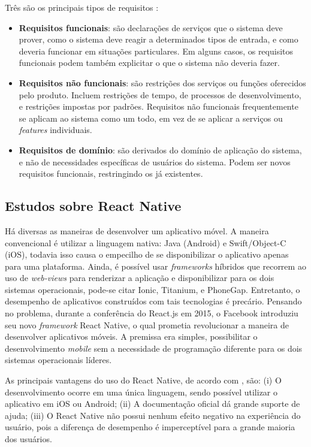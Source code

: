 Três são os principais tipos de requisitos \citep{Sommervile2010}:
\begin{itemize}
    \item \textbf{Requisitos funcionais}: são declarações de serviços que o sistema deve prover, como o sistema deve reagir a determinados tipos de entrada, e como deveria funcionar em situações particulares. Em alguns casos, os requisitos funcionais podem também explicitar o que o sistema não deveria fazer.
    
    \item \textbf{Requisitos não funcionais}: são restrições dos serviços ou funções oferecidos pelo produto. Incluem restrições de tempo, de processos de desenvolvimento, e restrições impostas por padrões. Requisitos não funcionais frequentemente se aplicam ao sistema como um todo, em vez de se aplicar a serviços ou \textit{features} individuais.
    
    \item \textbf{Requisitos de domínio}: são derivados do domínio de aplicação do sistema, e não de necessidades específicas de usuários do sistema. Podem ser novos requisitos funcionais, restringindo os já existentes. 
\end{itemize}


\subsection{Estudos sobre React Native} 
Há diversas as maneiras de desenvolver um aplicativo móvel. A maneira convencional é utilizar a linguagem nativa: Java (Android) e Swift/Object-C (iOS), todavia isso causa o empecilho de se disponibilizar o aplicativo apenas para uma plataforma. Ainda, é possível usar \textit{frameworks} híbridos que recorrem ao uso de \textit{web-views} para renderizar a aplicação e disponibilizar para os dois sistemas operacionais, pode-se citar Ionic, Titanium, e PhoneGap. Entretanto, o desempenho de aplicativos construídos com tais tecnologias é precário. Pensando no problema, durante a conferência do React.js em 2015, o Facebook introduziu seu novo \textit{framework} React Native, o qual prometia revolucionar a maneira de desenvolver aplicativos móveis. A premissa era simples, possibilitar o desenvolvimento \textit{mobile} sem a necessidade de programação diferente para os dois sistemas operacionais líderes.

As principais vantagens do uso do React Native, de acordo com \cite{danielsson2016}, são: (i) O desenvolvimento ocorre em uma única linguagem, sendo possível utilizar o aplicativo em iOS ou Android; (ii) A documentação oficial dá grande suporte de ajuda; (iii) O React Native não possui nenhum efeito negativo na experiência do usuário, pois a diferença de desempenho é imperceptível para a grande maioria dos usuários.

